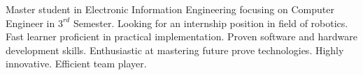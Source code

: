 

\begin{cvparagraph}

Master student in Electronic Information Engineering focusing on Computer Engineer in $3^{rd}$ Semester. Looking for an internship position in field of robotics. Fast learner proficient in practical implementation. Proven software and hardware development skills. Enthusiastic at mastering future prove technologies. Highly innovative. Efficient team player.

\end{cvparagraph}
